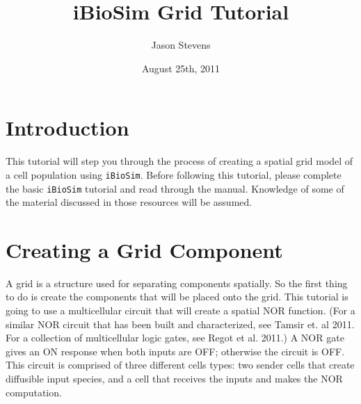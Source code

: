 \documentclass[titlepage,11pt]{article}
\title{iBioSim Grid Tutorial}
\author{Jason Stevens}
\date{August 25th, 2011}
\begin{document}
\maketitle

  
\tableofcontents

\clearpage
  

\section{Introduction}

\noindent
This tutorial will step you through the process of creating a spatial grid model of a cell population using {\tt iBioSim}.  Before following this tutorial, please complete the basic {\tt iBioSim} tutorial and read through the manual.  Knowledge of some of the material discussed in those resources will be assumed.



\section{Creating a Grid Component}

\noindent
A grid is a structure used for separating components spatially.  So the first thing to do is create the components that will be placed onto the grid.  This tutorial is going to use a multicellular circuit that will create a spatial NOR function.  (For a similar NOR circuit that has been built and characterized, see Tamsir et. al 2011.  For a collection of multicellular logic gates, see Regot et al. 2011.)  A NOR gate gives an ON response when both inputs are OFF; otherwise the circuit is OFF.  This circuit is comprised of three different cells types: two sender cells that create diffusible input species, and a cell that receives the inputs and makes the NOR computation.
\end{document}
